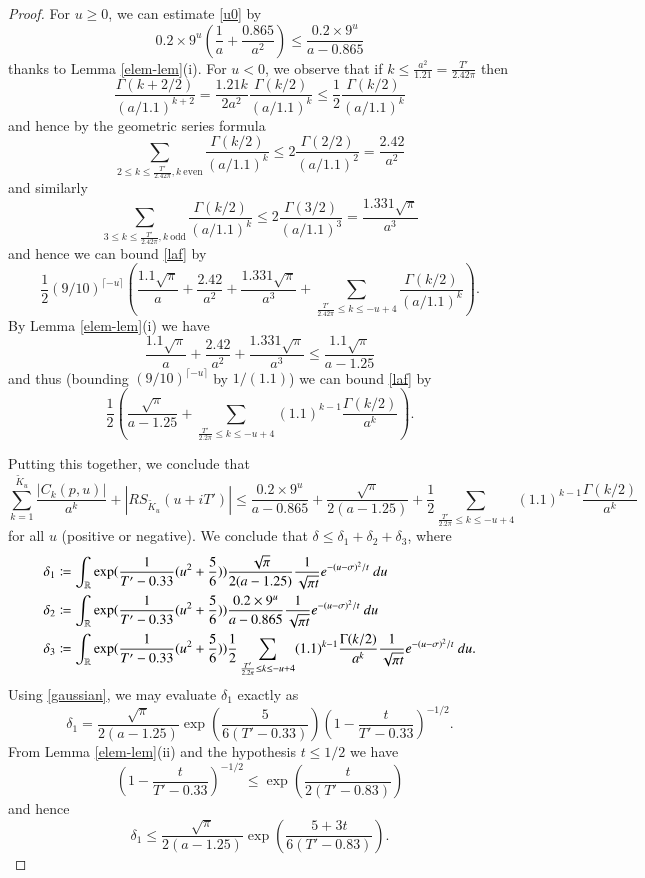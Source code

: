 \begin{proof}
For $u \geq 0$, we can estimate \eqref{u0} by
$$ 0.2 \times 9^u (\frac{1}{a} + \frac{0.865}{a^2}) \leq \frac{0.2 \times 9^u}{a - 0.865}$$
thanks to Lemma \ref{elem-lem}(i).  For $u<0$, we observe that if $k \leq \frac{a^2}{1.21} = \frac{T'}{2.42 \pi}$ then
$$ \frac{\Gamma(k+2/2)}{(a/1.1)^{k+2}} = \frac{1.21 k}{2 a^2} \frac{\Gamma(k/2)}{(a/1.1)^k} \leq \frac{1}{2} \frac{\Gamma(k/2)}{(a/1.1)^k}$$
and hence by the geometric series formula
$$ \sum_{2 \leq k \leq \frac{T'}{2.42 \pi}, k\ \mathrm{even}} \frac{\Gamma(k/2)}{(a/1.1)^k}  \leq 2 \frac{\Gamma(2/2)}{(a/1.1)^2} = \frac{2.42}{a^2}$$
and similarly
$$ \sum_{3 \leq k \leq \frac{T'}{2.42 \pi}, k\ \mathrm{odd}} \frac{\Gamma(k/2)}{(a/1.1)^k}  \leq 2 \frac{\Gamma(3/2)}{(a/1.1)^3} = \frac{1.331 \sqrt{\pi}}{a^3}$$
and hence we can bound \eqref{laf} by
$$ \frac{1}{2} (9/10)^{\lceil -u \rceil} (\frac{1.1 \sqrt{\pi}}{a} + \frac{2.42}{a^2} + \frac{1.331 \sqrt{\pi}}{a^3} + \sum_{\frac{T'}{2.42 \pi} \leq k \leq -u+4} \frac{\Gamma(k/2)}{(a/1.1)^k} ).$$
By Lemma \ref{elem-lem}(i) we have
$$ \frac{1.1 \sqrt{\pi}}{a} + \frac{2.42}{a^2} + \frac{1.331 \sqrt{\pi}}{a^3} \leq \frac{1.1 \sqrt{\pi}}{a - 1.25}$$
and thus (bounding $(9/10)^{\lceil -u \rceil}$ by $1/(1.1)$) we can bound \eqref{laf} by
$$ \frac{1}{2} (\frac{\sqrt{\pi}}{a-1.25} + \sum_{\frac{T'}{2.2 \pi} \leq k \leq -u+4} (1.1)^{k-1} \frac{\Gamma(k/2)}{a^k} ).$$

Putting this together, we conclude that
$$
\sum_{k=1}^{\tilde K_u} \frac{|C_k(p,u)|}{a^k} + |RS_{\tilde K_u}(u + iT')| \leq 
\frac{0.2 \times 9^u}{a-0.865} + \frac{\sqrt{\pi}}{2(a - 1.25)} + \frac{1}{2} \sum_{\frac{T'}{2.2 \pi} \leq k \leq -u+4} (1.1)^{k-1} \frac{\Gamma(k/2)}{a^k}$$
for all $u$ (positive or negative).  We conclude that $\delta \leq \delta_1 + \delta_2 + \delta_3$, where
\begin{align*}
\delta_1 &\coloneqq \int_{\mathbb{R}} \exp( \frac{1}{T'-0.33} (u^2 + \frac{5}{6}) ) \frac{\sqrt{\pi}}{2(a - 1.25)} \frac{1}{\sqrt{\pi t}} e^{-(u-\sigma)^2/t}\ du\\
\delta_2 &\coloneqq \int_{\mathbb{R}} \exp( \frac{1}{T'-0.33} (u^2 + \frac{5}{6}) ) \frac{0.2 \times 9^u}{a-0.865} \frac{1}{\sqrt{\pi t}} e^{-(u-\sigma)^2/t}\ du\\
\delta_3 &\coloneqq \int_{\mathbb{R}} \exp( \frac{1}{T'-0.33} (u^2 + \frac{5}{6}) ) \frac{1}{2} \sum_{\frac{T'}{2.2 \pi} \leq k \leq -u+4} (1.1)^{k-1} \frac{\Gamma(k/2)}{a^k} \frac{1}{\sqrt{\pi t}} e^{-(u-\sigma)^2/t}\ du.
\end{align*}
Using \eqref{gaussian}, we may evaluate $\delta_1$ exactly as
$$ \delta_1 = \frac{\sqrt{\pi}}{2(a - 1.25)} \exp( \frac{5}{6(T'-0.33)} ) (1 - \frac{t}{T'-0.33})^{-1/2}.$$
From Lemma \ref{elem-lem}(ii) and the hypothesis $t \leq 1/2$ we have
\begin{equation}\label{el}
 (1 - \frac{t}{T'-0.33})^{-1/2} \leq \exp( \frac{t}{2(T'-0.83)} )
\end{equation}
and hence
$$ \delta_1 \leq \frac{\sqrt{\pi}}{2(a - 1.25)} \exp( \frac{5+3t}{6(T'-0.83)} ).$$


\end{proof}
